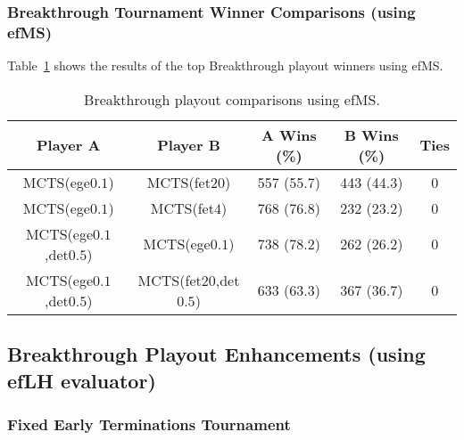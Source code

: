 \documentclass{article}
\begin{document}
\subsubsection{Breakthrough Tournament Winner Comparisons (using efMS)}


Table~\ref{tbl:bt-efMS-toptourney} shows the results of the top Breakthrough playout winners using efMS.

\begin{table}[h!]
\begin{center}
\begin{tabular}{|c|c|ccc|}
\hline
Player A & Player B                             & A Wins (\%)  & B Wins (\%)  & Ties \\ 
\hline
MCTS(ege$0.1$)          & MCTS(fet$20$)          & 557 (55.7)   & 443 (44.3)   & 0    \\
MCTS(ege$0.1$)          & MCTS(fet$4$)           & 768 (76.8)   & 232 (23.2)   & 0    \\
MCTS(ege$0.1$,det$0.5$) & MCTS(ege$0.1$)         & 738 (78.2)   & 262 (26.2)   & 0    \\
MCTS(ege$0.1$,det$0.5$) & MCTS(fet$20$,det$0.5$) & 633 (63.3)   & 367 (36.7)   & 0    \\
\hline
\end{tabular}
\end{center}
\caption{Breakthrough playout comparisons using efMS. \label{tbl:bt-efMS-toptourney}}
\end{table}

\subsection{Breakthrough Playout Enhancements (using efLH evaluator)}

\subsubsection{Fixed Early Terminations Tournament}
\end{document}
